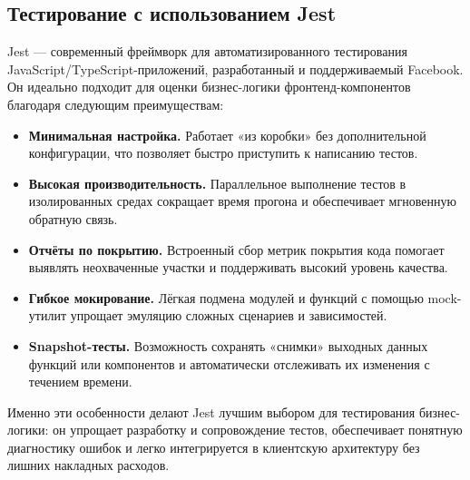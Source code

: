 \subsection{Тестирование с использованием Jest}

Jest — современный фреймворк для автоматизированного тестирования JavaScript/TypeScript-приложений, разработанный и поддерживаемый Facebook. Он идеально подходит для оценки бизнес-логики фронтенд-компонентов благодаря следующим преимуществам:

\begin{itemize}
	\item \textbf{Минимальная настройка.} Работает «из коробки» без дополнительной конфигурации, что позволяет быстро приступить к написанию тестов.
	\item \textbf{Высокая производительность.} Параллельное выполнение тестов в изолированных средах сокращает время прогона и обеспечивает мгновенную обратную связь.
	\item \textbf{Отчёты по покрытию.} Встроенный сбор метрик покрытия кода помогает выявлять неохваченные участки и поддерживать высокий уровень качества.
	\item \textbf{Гибкое мокирование.} Лёгкая подмена модулей и функций с помощью mock-утилит упрощает эмуляцию сложных сценариев и зависимостей.
	\item \textbf{Snapshot-тесты.} Возможность сохранять «снимки» выходных данных функций или компонентов и автоматически отслеживать их изменения с течением времени.
\end{itemize}

Именно эти особенности делают Jest лучшим выбором для тестирования бизнес-логики: он упрощает разработку и сопровождение тестов, обеспечивает понятную диагностику ошибок и легко интегрируется в клиентскую архитектуру без лишних накладных расходов.
